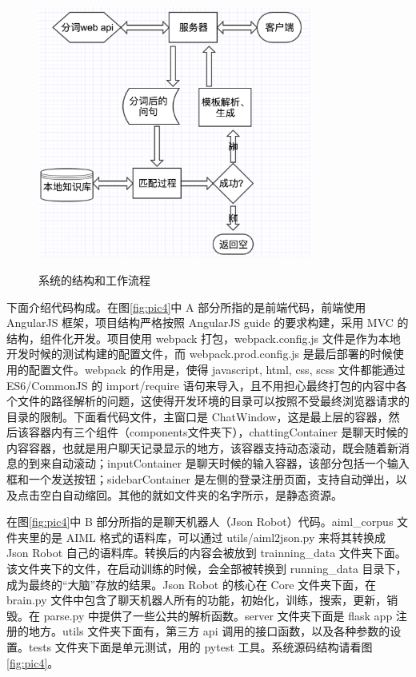 \documentclass[bachelor,winfonts]{jnuthesis}
\begin{document}
\begin{figure}[htbp]
  \centering
  \includegraphics[width= 0.8\textwidth]{flow-chart.png}\\
  \caption{系统的结构和工作流程}\label{fig:pic3}
\end{figure}


下面介绍代码构成。在图\ref{fig:pic4}中 A 部分所指的是前端代码，前端使用 AngularJS 框架，项目结构严格按照 AngularJS guide 的要求构建，采用 MVC 的结构，组件化开发。项目使用 webpack 打包，webpack.config.js 文件是作为本地开发时候的测试构建的配置文件，而 webpack.prod.config.js 是最后部署的时候使用的配置文件。webpack 的作用是，使得 javascript, html, css, scss 文件都能通过 ES6/CommonJS 的 import/require 语句来导入，且不用担心最终打包的内容中各个文件的路径解析的问题，这使得开发环境的目录可以按照不受最终浏览器请求的目录的限制。下面看代码文件，主窗口是 ChatWindow，这是最上层的容器，然后该容器内有三个组件（components文件夹下），chattingContainer 是聊天时候的内容容器，也就是用户聊天记录显示的地方，该容器支持动态滚动，既会随着新消息的到来自动滚动；inputContainer 是聊天时候的输入容器，该部分包括一个输入框和一个发送按钮；sidebarContainer 是左侧的登录注册页面，支持自动弹出，以及点击空白自动缩回。其他的就如文件夹的名字所示，是静态资源。

在图\ref{fig:pic4}中 B 部分所指的是聊天机器人（Json Robot）代码。aiml\_corpus 文件夹里的是 AIML 格式的语料库，可以通过 utils/aiml2json.py 来将其转换成 Json Robot 自己的语料库。转换后的内容会被放到 trainning\_data 文件夹下面。该文件夹下的文件，在启动训练的时候，会全部被转换到 running\_data 目录下，成为最终的“大脑”存放的结果。Json Robot 的核心在 Core 文件夹下面，在 brain.py 文件中包含了聊天机器人所有的功能，初始化，训练，搜索，更新，销毁。在 parse.py 中提供了一些公共的解析函数。server 文件夹下面是 flask app 注册的地方。utils 文件夹下面有，第三方 api 调用的接口函数，以及各种参数的设置。tests 文件夹下面是单元测试，用的 pytest 工具。系统源码结构请看图\ref{fig:pic4}。
\end{document}

